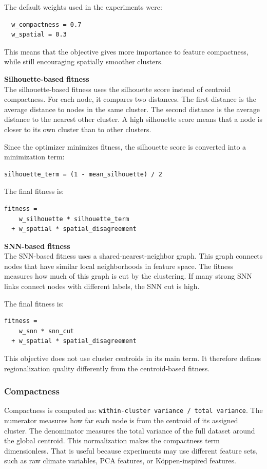 \documentclass[11pt]{article}
\begin{document}
The default weights used in the experiments were:
\begin{verbatim}
  w_compactness = 0.7
  w_spatial = 0.3
\end{verbatim}

This means that the objective gives more importance to feature compactness, while still encouraging spatially smoother clusters. 

\textbf{Silhouette-based fitness} \\
The silhouette-based fitness uses the silhouette score instead of centroid compactness. For each node, it compares two distances. The first distance is the average distance to nodes in the same cluster. The second distance is the average distance to the nearest other cluster. A high silhouette score means that a node is closer to its own cluster than to other clusters.

Since the optimizer minimizes fitness, the silhouette score is converted into a minimization term:
\begin{verbatim}
silhouette_term = (1 - mean_silhouette) / 2
\end{verbatim}

The final fitness is:
\begin{verbatim}
fitness =
    w_silhouette * silhouette_term
  + w_spatial * spatial_disagreement
\end{verbatim}

\textbf{SNN-based fitness} \\
The SNN-based fitness uses a shared-nearest-neighbor graph. This graph connects nodes that have similar local neighborhoods in feature space. The fitness measures how much of this graph is cut by the clustering. If many strong SNN links connect nodes with different labels, the SNN cut is high.

The final fitness is:
\begin{verbatim}
fitness =
    w_snn * snn_cut
  + w_spatial * spatial_disagreement
\end{verbatim}

This objective does not use cluster centroids in its main term. It therefore defines regionalization quality differently from the centroid-based fitness.


\subsubsection{Compactness}
Compactness is computed as:
\texttt{within-cluster variance / total variance}. The numerator measures how far each node is from the centroid of its assigned cluster. The denominator measures the total variance of the full dataset around the global centroid. This normalization makes the compactness term dimensionless. That is useful because experiments may use different feature sets, such as raw climate variables, PCA features, or Köppen-inspired features.
\end{document}

